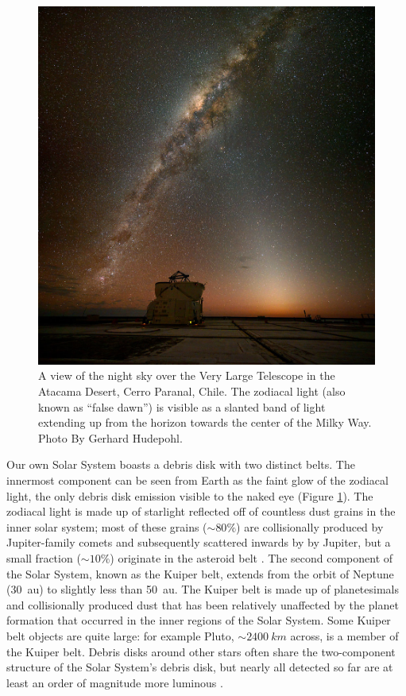 \documentclass[12pt,oneside]{book}
\begin{document}
\begin{figure}
  \includegraphics[width=\textwidth]{../figures/zodiacal_light}
  \caption{
  A view of the night sky over the Very Large Telescope in the Atacama Desert, Cerro Paranal, Chile. 
  The zodiacal light (also known as ``false dawn'') is visible as a slanted band of light extending up from the horizon towards the center of the Milky Way.
  Photo By Gerhard Hudepohl.}
  \label{fig: zodiacal}
\end{figure}

\clearpage
Our own Solar System boasts a debris disk with two distinct belts.
The innermost component can be seen from Earth as the faint glow of the zodiacal light, the only debris disk emission visible to the naked eye (Figure \ref{fig: zodiacal}). 
The zodiacal light is made up of starlight reflected off of countless dust grains in the inner solar system; most of these grains ($\sim 80\%$) are collisionally produced by Jupiter-family comets and subsequently scattered inwards by by Jupiter, but a small fraction ($\sim 10\%$) originate in the asteroid belt \citep{nesvorny10,wyatt2008}.
The second component of the Solar System, known as the Kuiper belt, extends from the orbit of Neptune (\SI{30}{au}) to slightly less than \SI{50}{au}.
The Kuiper belt is made up of planetesimals and collisionally produced dust that has been relatively unaffected by the planet formation that occurred in the inner regions of the Solar System.
Some Kuiper belt objects are quite large: for example Pluto, $\sim \SI{2400}{km}$ across, is a member of the Kuiper belt.
Debris disks around other stars often share the two-component structure of the Solar System's debris disk, but nearly all detected so far are at least an order of magnitude more luminous \citep{matthews14}.
\end{document}
